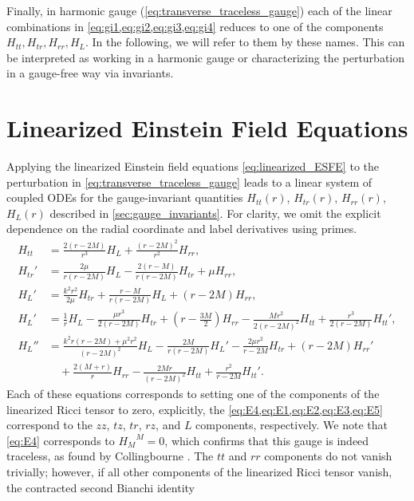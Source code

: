 \documentclass[11pt,aip,jmp,amsmath,amssymb,draft]{revtex4-1}
\begin{document}
Finally, in harmonic gauge (\cref{eq:transverse_traceless_gauge}) each of the linear combinations in \cref{eq:gi1,eq:gi2,eq:gi3,eq:gi4} reduces to one of the components $H_{tt}, H_{tr}, H_{rr}, H_L$. In the following, we will refer to them by these names. This can be interpreted as working in a harmonic gauge or characterizing the perturbation in a gauge-free way via invariants.


\section{\label{sec:linearized} Linearized Einstein Field Equations}
Applying the linearized Einstein field equations \cref{eq:linearized_ESFE} to the perturbation in \cref{eq:transverse_traceless_gauge} leads to a linear system of coupled ODEs for the gauge-invariant quantities $H_{tt}(r)$, $H_{tr}(r)$, $H_{rr}(r)$, $H_L(r)$ described in \cref{sec:gauge_invariants}.
For clarity, we omit the explicit dependence on the radial coordinate and label derivatives using primes.
\begin{align}
    H_{tt} &= \frac{2 ( r-2 M)}{ r^3} H_L +\frac{(r-2 M)^2}{ r^2} H_{rr}, \label{eq:E4}\\
    H_{tr}' & =\frac{2 \mu}{r (r-2 M)} H_L - \frac{2 (r-M) }{r (r-2 M)}H_{tr}+\mu H_{rr}, \label{eq:E1} \\
    H_L' &= \frac{k^2  r^2 }{2 \mu}H_{tr} + \frac{r-M}{r(r-2M)}H_L +(r-2 M) H_{rr}, \label{eq:E2} \\
    H_L' &= \frac{1}{r} H_L-\frac{\mu  r^3}{2(r - 2M)}  H_{tr} + \left(r-\frac{3 M}{2}\right) H_{rr} -\frac{M r^2 }{2 ( r-2 M)^2}H_{tt} +\frac{ r^3}{2 ( r-2 M)}H_{tt}', \label{eq:E3}\\
    H_L'' &= \frac{k^2 r(r-2 M)+\mu^2 r^2}{( r-2 M)^2} H_L  -\frac{2 M }{r(r-2 M)}H_L' -\frac{2 \mu  r^2 }{ r-2 M}H_{tr} +( r-2 M) H_{rr}' \nonumber \\
         &\quad + \frac{2 (M+r)}{r} H_{rr} -\frac{2 M  r}{( r-2 M)^2} H_{tt} +\frac{ r^2}{ r-2 M} H_{tt}'.\label{eq:E5}
\end{align}
Each of these equations corresponds to setting one of the components of the linearized Ricci tensor to zero, explicitly, the \cref{eq:E4,eq:E1,eq:E2,eq:E3,eq:E5} correspond to the $zz$, $tz$, $tr$, $rz$, and $L$ components, respectively.
We note that \cref{eq:E4} corresponds to ${H_{M}}^M = 0$, which confirms that this gauge is indeed traceless, as found by Collingbourne \cite[Lemma~3.6]{collingbourne2021gregory}.
The $tt$ and $rr$ components do not vanish trivially; however, if all other components of the linearized Ricci tensor vanish, the contracted second Bianchi identity 
\end{document}
